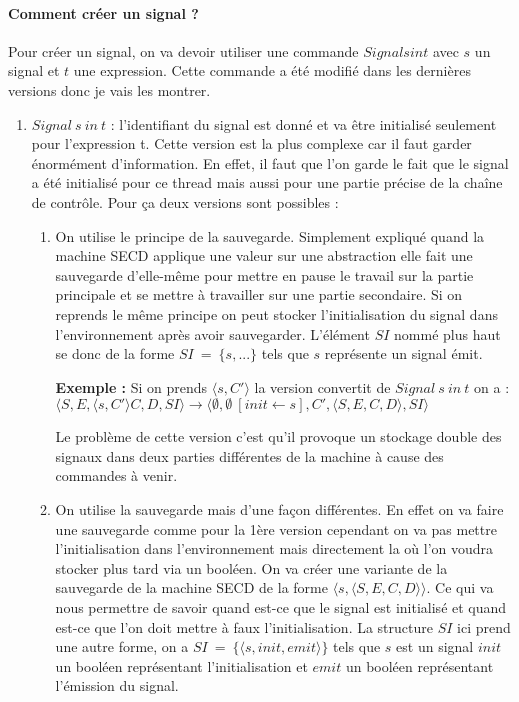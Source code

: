 \documentclass[10pt,a4paper]{article}
\begin{document}
				\paragraph{Comment créer un signal ?}
				Pour créer un signal, on va devoir utiliser une commande $Signal s in t$ avec $s$ un signal et $t$ une expression. Cette commande a été modifié dans les dernières versions donc je vais les montrer.
				\smallbreak
				\begin{enumerate}
					\item $Signal~s~in~t$ : l'identifiant du signal est donné et va être initialisé seulement pour l'expression t. Cette version est la plus complexe car il faut garder énormément d'information. En effet, il faut que l'on garde le fait que le signal a été initialisé pour ce thread mais aussi pour une partie précise de la chaîne de contrôle. Pour ça deux versions sont possibles :
					\begin{enumerate}
						\item On utilise le principe de la sauvegarde. Simplement expliqué quand la machine SECD applique une valeur sur une abstraction elle fait une sauvegarde d'elle-même pour mettre en pause le travail sur la partie principale et se mettre à travailler sur une partie secondaire. Si on reprends le même principe on peut stocker l'initialisation du signal dans l'environnement après avoir sauvegarder. L'élément $SI$ nommé plus haut se donc de la forme $SI~=~\{s,...\}$ tels que $s$ représente un signal émit.
						\medbreak
							
						\textbf{Exemple :} Si on prends $\langle s,C'\rangle$ la version convertit de $Signal~s~in~t$ on a : 
						\\$\langle S,E,\langle s,C'\rangle C,D,SI\rangle \longrightarrow \langle \emptyset,\emptyset~[init \leftarrow s],C',\langle S,E,C,D\rangle,SI\rangle$  
						\medbreak
							
						Le problème de cette version c'est qu'il provoque un stockage double des signaux dans deux parties différentes de la machine à cause des commandes à venir.
							
						\item On utilise la sauvegarde mais d'une façon différentes. En effet on va faire une sauvegarde comme pour la 1ère version cependant on va pas mettre l'initialisation dans l'environnement mais directement la où l'on voudra stocker plus tard via un booléen. On va créer une variante de la sauvegarde de la machine SECD de la forme $\langle s,\langle S,E,C,D\rangle\rangle$. Ce qui va nous permettre de savoir quand est-ce que le signal est initialisé et quand est-ce que l'on doit mettre à faux l'initialisation. La structure $SI$ ici prend une autre forme, on a $SI~=~\{\langle s,init,emit\rangle\}$ tels que $s$ est un signal $init$ un booléen représentant l'initialisation et $emit$ un booléen représentant l'émission du signal.
						\medbreak
							

\end{enumerate}
\end{enumerate}
\end{document}

